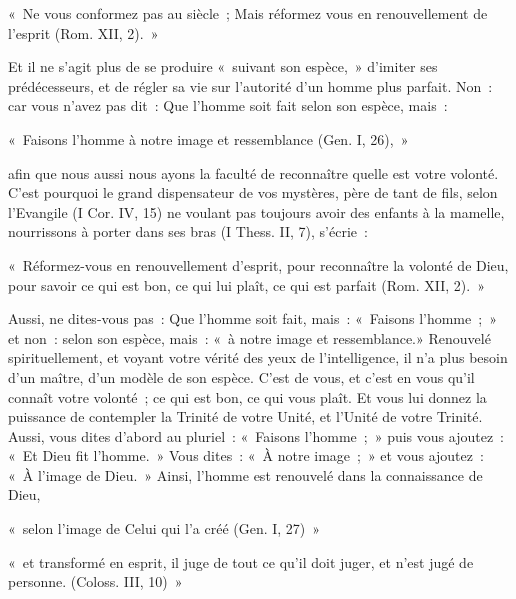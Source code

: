 \documentclass[french,twoside]{book} %
\newenvironment{quoteblock}%
  {\begin{quoting}}
  {\end{quoting}}
\newenvironment{quotebar}{%
    \def\FrameCommand{{\color{rubric!10!}\vrule width 0.5em} \hspace{0.9em}}%
    \def\OuterFrameSep{\itemsep} %
    \MakeFramed {\advance\hsize-\width \FrameRestore}
  }%
  {%
    \endMakeFramed
  }
\renewenvironment{quoteblock}%
  {%
    \savenotes
    \setstretch{0.9}
    \normalfont
    \begin{quotebar}
  }
  {%
    \end{quotebar}
    \spewnotes
  }
\begin{document}
\begin{quoteblock}
\noindent « Ne vous conformez pas au siècle ; Mais réformez vous en renouvellement de l’esprit (Rom. XII, 2). »\end{quoteblock}

\noindent Et il ne s’agit plus de se produire « suivant son espèce, » d’imiter ses prédécesseurs, et de régler sa vie sur l’autorité d’un homme plus parfait. Non : car vous n’avez pas dit : Que l’homme soit fait selon son espèce, mais :\par

\begin{quoteblock}
\noindent « Faisons l’homme à notre image et ressemblance (Gen. I, 26), »\end{quoteblock}

\noindent afin que nous aussi nous ayons la faculté de reconnaître quelle est votre volonté. C’est pourquoi le grand dispensateur de vos mystères, père de tant de fils, selon l’Evangile (I Cor. IV, 15) ne voulant pas toujours avoir des enfants à la mamelle, nourrissons à porter dans ses bras (I Thess. II, 7), s’écrie :\par

\begin{quoteblock}
\noindent « Réformez-vous en renouvellement d’esprit, pour reconnaître la volonté de Dieu, pour savoir ce qui est bon, ce qui lui plaît, ce qui est parfait (Rom. XII, 2). »\end{quoteblock}

\noindent Aussi, ne dites-vous pas : Que l’homme soit fait, mais : « Faisons l’homme ; » et non : selon son espèce, mais : « à notre image et ressemblance.» Renouvelé spirituellement, et voyant votre vérité des yeux de l’intelligence, il n’a plus besoin d’un maître, d’un modèle de son espèce. C’est de vous, et c’est en vous qu’il connaît votre volonté ; ce qui est bon, ce qui vous plaît. Et vous lui donnez la puissance de contempler la Trinité de votre Unité, et l’Unité de votre Trinité. Aussi, vous dites d’abord au pluriel : « Faisons l’homme ; » puis vous ajoutez : « Et Dieu fit l’homme. » Vous dites : « À notre image ; » et vous ajoutez : « À l’image de Dieu. » Ainsi, l’homme est renouvelé dans la connaissance de Dieu,\par

\begin{quoteblock}
\noindent « selon l’image de Celui qui l’a créé (Gen. I, 27) »\end{quoteblock}


\begin{quoteblock}
\noindent « et transformé en esprit, il juge de tout ce qu’il doit juger, et n’est jugé de personne. (Coloss. III, 10) »\end{quoteblock}
\end{document}
